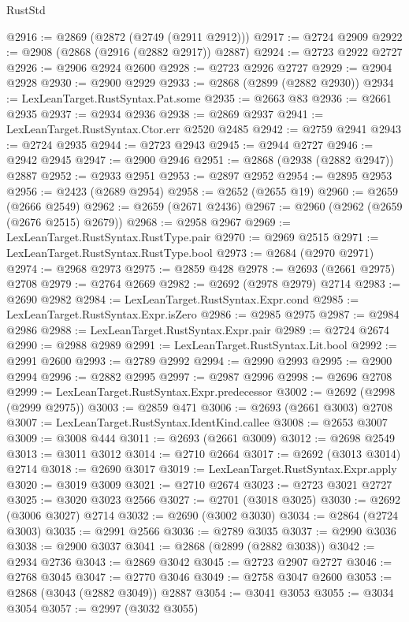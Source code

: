 \begin{lexlean}{RustStd}
\begin{coremodule}
@2916 := @2869 (@2872 (@2749 (@2911 @2912)))
@2917 := @2724 @2909
@2922 := @2908 (@2868 (@2916 (@2882 @2917)) @2887)
@2924 := @2723 @2922 @2727
@2926 := @2906 @2924 @2600
@2928 := @2723 @2926 @2727
@2929 := @2904 @2928
@2930 := @2900 @2929
@2933 := @2868 (@2899 (@2882 @2930))
@2934 := LexLeanTarget.RustSyntax.Pat.some
@2935 := @2663 @83
@2936 := @2661 @2935
@2937 := @2934 @2936
@2938 := @2869 @2937
@2941 := LexLeanTarget.RustSyntax.Ctor.err @2520 @2485
@2942 := @2759 @2941
@2943 := @2724 @2935
@2944 := @2723 @2943
@2945 := @2944 @2727
@2946 := @2942 @2945
@2947 := @2900 @2946
@2951 := @2868 (@2938 (@2882 @2947)) @2887
@2952 := @2933 @2951
@2953 := @2897 @2952
@2954 := @2895 @2953
@2956 := @2423 (@2689 @2954)
@2958 := @2652 (@2655 @19)
@2960 := @2659 (@2666 @2549)
@2962 := @2659 (@2671 @2436)
@2967 := @2960 (@2962 (@2659 (@2676 @2515) @2679))
@2968 := @2958 @2967
@2969 := LexLeanTarget.RustSyntax.RustType.pair
@2970 := @2969 @2515
@2971 := LexLeanTarget.RustSyntax.RustType.bool
@2973 := @2684 (@2970 @2971)
@2974 := @2968 @2973
@2975 := @2859 @428
@2978 := @2693 (@2661 @2975) @2708
@2979 := @2764 @2669
@2982 := @2692 (@2978 @2979) @2714
@2983 := @2690 @2982
@2984 := LexLeanTarget.RustSyntax.Expr.cond
@2985 := LexLeanTarget.RustSyntax.Expr.isZero
@2986 := @2985 @2975
@2987 := @2984 @2986
@2988 := LexLeanTarget.RustSyntax.Expr.pair
@2989 := @2724 @2674
@2990 := @2988 @2989
@2991 := LexLeanTarget.RustSyntax.Lit.bool
@2992 := @2991 @2600
@2993 := @2789 @2992
@2994 := @2990 @2993
@2995 := @2900 @2994
@2996 := @2882 @2995
@2997 := @2987 @2996
@2998 := @2696 @2708
@2999 := LexLeanTarget.RustSyntax.Expr.predecessor
@3002 := @2692 (@2998 (@2999 @2975))
@3003 := @2859 @471
@3006 := @2693 (@2661 @3003) @2708
@3007 := LexLeanTarget.RustSyntax.IdentKind.callee
@3008 := @2653 @3007
@3009 := @3008 @444
@3011 := @2693 (@2661 @3009)
@3012 := @2698 @2549
@3013 := @3011 @3012
@3014 := @2710 @2664
@3017 := @2692 (@3013 @3014) @2714
@3018 := @2690 @3017
@3019 := LexLeanTarget.RustSyntax.Expr.apply
@3020 := @3019 @3009
@3021 := @2710 @2674
@3023 := @2723 @3021 @2727
@3025 := @3020 @3023 @2566
@3027 := @2701 (@3018 @3025)
@3030 := @2692 (@3006 @3027) @2714
@3032 := @2690 (@3002 @3030)
@3034 := @2864 (@2724 @3003)
@3035 := @2991 @2566
@3036 := @2789 @3035
@3037 := @2990 @3036
@3038 := @2900 @3037
@3041 := @2868 (@2899 (@2882 @3038))
@3042 := @2934 @2736
@3043 := @2869 @3042
@3045 := @2723 @2907 @2727
@3046 := @2768 @3045
@3047 := @2770 @3046
@3049 := @2758 @3047 @2600
@3053 := @2868 (@3043 (@2882 @3049)) @2887
@3054 := @3041 @3053
@3055 := @3034 @3054
@3057 := @2997 (@3032 @3055)

\end{coremodule}
\end{lexlean}
